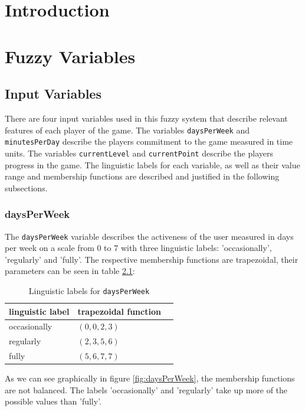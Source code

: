 \chapter{Introduction}

\chapter{Fuzzy Variables}

\section{Input Variables}

There are four input variables used in this fuzzy system that describe relevant features of each player of the game. The variables \texttt{daysPerWeek} and \texttt{minutesPerDay} describe the players commitment to the game measured in time units. The variables \texttt{currentLevel} and \texttt{currentPoint} describe the players progress in the game. The linguistic labels for each variable, as well as their value range and membership functions are described and justified in the following subsections. 

\subsection{daysPerWeek}

The \texttt{daysPerWeek} variable describes the activeness of the user measured in days per week on a scale from 0 to 7 with three linguistic labels: 'occasionally', 'regularly' and 'fully'. The respective membership functions are trapezoidal, their parameters can be seen in table \ref{tab:daysPerWeek}:

\begin{table}[H]
\centering
\begin{tabular}{@{}lll@{}}
\toprule
\textbf{linguistic label}  & \textbf{trapezoidal function} \\ 
\midrule
occasionally  & $(0,0,2,3)$ \\
regularly & $(2,3,5,6)$ \\
fully & $(5,6,7,7)$ \\
\bottomrule
\end{tabular}
\caption{Linguistic labels for \texttt{daysPerWeek}}
\label{tab:daysPerWeek}
\end{table}

As we can see graphically in figure \ref{fig:daysPerWeek}, the membership functions are not balanced. The labels 'occasionally' and 'regularly' take up more of the possible values than 'fully'.

